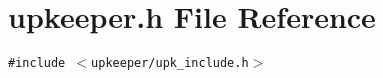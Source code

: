 \section{upkeeper.h File Reference}
\label{upkeeper_8h}
{\tt \#include $<$upkeeper/upk\_\-include.h$>$}\par
